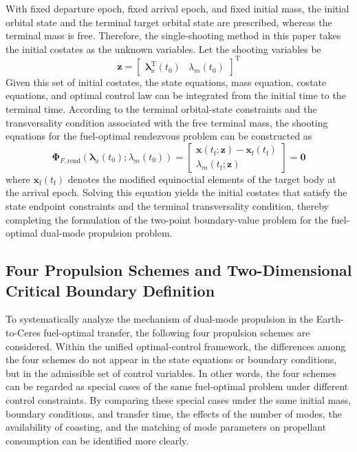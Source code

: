 ﻿\documentclass{IEEEtaes}
\begin{document}
With fixed departure epoch, fixed arrival epoch, and fixed initial mass, the initial orbital state and the terminal target orbital state are prescribed, whereas the terminal mass is free. Therefore, the single-shooting method in this paper takes the initial costates as the unknown variables. Let the shooting variables be
\begin{equation}
\bm{z}=\begin{bmatrix}\bm{\lambda}_x^{\mathrm{T}}(t_0)&\lambda_m(t_0)\end{bmatrix}^{\mathrm{T}}
\end{equation}
Given this set of initial costates, the state equations, mass equation, costate equations, and optimal control law can be integrated from the initial time to the terminal time. According to the terminal orbital-state constraints and the transversality condition associated with the free terminal mass, the shooting equations for the fuel-optimal rendezvous problem can be constructed as
\begin{equation}
\bm{\Phi}_{F,\mathrm{rend}}\left(\bm{\lambda}_x(t_0);\lambda_m(t_0)\right)=
\begin{bmatrix}
\bm{x}(t_{\mathrm{f}};\bm{z})-\bm{x}_{\mathrm{f}}(t_{\mathrm{f}})\\
\lambda_m(t_{\mathrm{f}};\bm{z})
\end{bmatrix}=\bm{0}
\end{equation}
where $\bm{x}_{\mathrm{f}}(t_{\mathrm{f}})$ denotes the modified equinoctial elements of the target body at the arrival epoch. Solving this equation yields the initial costates that satisfy the state endpoint constraints and the terminal transversality condition, thereby completing the formulation of the two-point boundary-value problem for the fuel-optimal dual-mode propulsion problem.

\subsection{Four Propulsion Schemes and Two-Dimensional Critical Boundary Definition}
To systematically analyze the mechanism of dual-mode propulsion in the Earth-to-Ceres fuel-optimal transfer, the following four propulsion schemes are considered. Within the unified optimal-control framework, the differences among the four schemes do not appear in the state equations or boundary conditions, but in the admissible set of control variables. In other words, the four schemes can be regarded as special cases of the same fuel-optimal problem under different control constraints. By comparing these special cases under the same initial mass, boundary conditions, and transfer time, the effects of the number of modes, the availability of coasting, and the matching of mode parameters on propellant consumption can be identified more clearly.
\end{document}
